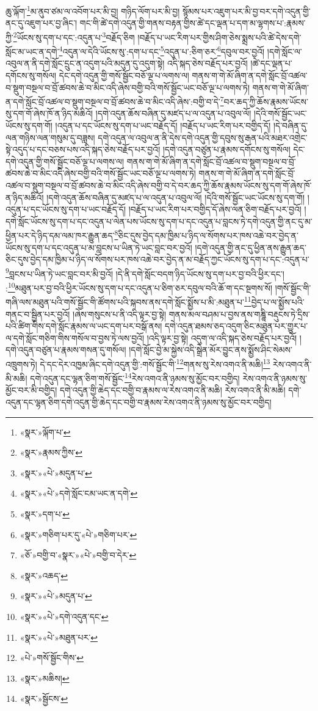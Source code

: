 ཆུ་ལྐོག་\footnote{«སྣར་»ལྐོག་པ་}མ་ནུབ་ཙམ་ལ་འབོག་པར་མི་བྱ། གཉིད་ལོག་པར་མི་བྱ། སྙོམས་པར་འཇུག་པར་མི་བྱ་བར་དགེ་འདུན་གྱི་ནང་དུ་འཇུག་པར་བྱ་ཞིང་། གང་གི་ཚེ་དགེ་འདུན་གྱི་གནས་བརྟན་གྱིས་ཚེ་དང་ལྡན་པ་དག་མ་ལྷགས་པ་:རྣམས་ཀྱི་\footnote{«སྣར་»རྣམས་ཀྱིས་}ཡོངས་སུ་དག་པ་དང་:འདུན་པ་\footnote{«སྣར་»«པེ་»མདུན་པ་}བརྗོད་ཅིག །བརྗོད་པ་ཡང་རིག་པར་གྱིས་ཤིག་ཅེས་སྨྲས་པའི་ཚེ་དེས་དགེ་སློང་མ་ཡང་ན་དགེ་\footnote{«སྣར་»«པེ་»དགེ་སློང་ངམ་ཡང་ན་དགེ་}འདུན་ལ་དེའི་ཡོངས་སུ་:དག་པ་དང་\footnote{«སྣར་»དག་པ་}འདུན་པ་:ཅིག་ཅར་\footnote{«སྣར་»གཅིག་པར་དུ་«པེ་»གཅིག་པར་}དབུལ་བར་བྱའོ། །དགེ་སློང་ལ་འབུལ་ན་ནི་དགེ་སློང་དྲུང་ན་འདུག་པའི་མདུན་དུ་འདུག་སྟེ། འདི་སྐད་ཅེས་བརྗོད་པར་བྱའོ། །ཚེ་དང་ལྡན་པ་དགོངས་སུ་གསོལ། དེང་དགེ་འདུན་གྱི་གསོ་སྦྱོང་བཅོ་ལྔ་པ་ལགས་ལ། གནས་ག་གེ་མོ་ཞིག་ན་དགེ་སློང་བྲོ་འཚལ་བ་སྡུག་བསྔལ་བ་བྲོ་ཚབས་ཆེ་བ་མིང་འདི་ཞེས་བགྱི་བའི་གསོ་སྦྱོང་ཡང་བཅོ་ལྔ་པ་ལགས་ཏེ། གནས་ག་གེ་མོ་ཞིག་ན་དགེ་སློང་བྲོ་འཚལ་བ་སྡུག་བསྔལ་བ་བྲོ་ཚབས་ཆེ་བ་མིང་འདི་ཞེས་:བགྱི་བ་དེ་\footnote{«ཅོ་»བགྱི་བ་«སྣར་»«པེ་»བགྱི་བ་དེར་}བར་ཆད་ཀྱི་ཆོས་རྣམས་ཡོངས་སུ་དག་གོ་ཞེས་ཁོ་ན་ཉིད་མཆིའོ། །དགེ་འདུན་ཆོས་བཞིན་དུ་མཛད་པ་ལ་འདུན་པ་འབུལ་ལོ། །དེའི་གསོ་སྦྱོང་ཡང་ཡོངས་སུ་དག་གོ། །འདུན་པ་དང་ཡོངས་སུ་དག་པ་ཡང་བརྗོད་དོ། །བརྗོད་པ་ཡང་རིག་པར་བགྱིད་དོ། །དེ་བཞིན་དུ་ལན་གཉིས་ལན་གསུམ་དུ་བཟླས། དགེ་འདུན་ལ་འབུལ་ན་ནི་དེས་དགེ་འདུན་གྱི་དབུས་སུ་རྒན་པའི་མཐར་འགྲེང་སྟེ་འདུད་པ་དང་བཅས་པས་འདི་སྐད་ཅེས་བརྗོད་པར་བྱའོ། །དགེ་འདུན་བཙུན་པ་རྣམས་དགོངས་སུ་གསོལ། དེང་དགེ་འདུན་གྱི་གསོ་སྦྱོང་བཅོ་ལྔ་པ་ལགས་ལ། གནས་ག་གེ་མོ་ཞིག་ན་དགེ་སློང་བྲོ་འཚལ་བ་སྡུག་བསྔལ་བ་བྲོ་ཚབས་ཆེ་བ་མིང་འདི་ཞེས་བགྱི་བའི་གསོ་སྦྱོང་ཡང་བཅོ་ལྔ་པ་ལགས་ཏེ། གནས་ག་གེ་མོ་ཞིག་ན་དགེ་སློང་བྲོ་འཚལ་བ་སྡུག་བསྔལ་བ་བྲོ་ཚབས་ཆེ་བ་མིང་འདི་ཞེས་བགྱི་བ་དེ་བར་ཆད་ཀྱི་ཆོས་རྣམས་ཡོངས་སུ་དག་གོ་ཞེས་ཁོ་ན་ཉིད་མཆིའོ། །དགེ་འདུན་ཆོས་བཞིན་དུ་མཛད་པ་ལ་འདུན་པ་འབུལ་ལོ། །དེའི་གསོ་སྦྱོང་ཡང་ཡོངས་སུ་དག་གོ། །འདུན་པ་དང་ཡོངས་སུ་དག་པ་ཡང་བརྗོད་དོ། །བརྗོད་པ་ཡང་རིག་པར་བགྱིད་དོ་ཞེས་ལན་ཅིག་བརྗོད་པར་བྱའོ། །དགེ་སློང་ཡོངས་སུ་དག་པ་དང་འདུན་པ་ལེན་པས་ཡོངས་སུ་དག་པ་དང་འདུན་པ་བླངས་ཏེ་དགེ་འདུན་གྱི་ནང་དུ་མ་ཕྱིན་པར་དེ་ཉིད་དམ་ལམ་ཁར་རྒྱུན་ཆད་\footnote{«སྣར་»འཆད་}ཅིང་དུས་བྱེད་དམ་ཁྱིམ་པ་ཉིད་ལ་སོགས་པར་ཁས་འཆེ་བར་བྱེད་ན་ཡོངས་སུ་དག་པ་དང་འདུན་པ་མ་བླངས་པ་ཡིན་ཏེ་ཡང་བླང་བར་བྱའོ། །དགེ་འདུན་གྱི་ནང་དུ་ཕྱིན་ནས་རྒྱུན་ཆད་ཅིང་དུས་བྱེད་དམ་ཁྱིམ་པ་ཉིད་ལ་སོགས་པར་ཁས་འཆེ་བར་བྱེད་ན་མ་བརྗོད་ཀྱང་ཡོངས་སུ་དག་པ་དང་:འདུན་པ་\footnote{«སྣར་»«པེ་»མདུན་པ་}བླངས་པ་ཡིན་ཏེ་ཡང་བླང་བར་མི་བྱའོ། །དེ་ནི་དགེ་སློང་བདག་ཉིད་ཡོངས་སུ་དག་པར་བྱ་བའི་ཕྱིར་དང་། :\footnote{«སྣར་»«པེ་»དགེ་འདུན་དང་}མཐུན་པར་བྱ་བའི་ཕྱིར་ཡོངས་སུ་དག་པ་དང་འདུན་པ་ཅིག་ཅར་དབུལ་བའི་ཆོ་ག་དང་སྔགས་སོ། །གསོ་སྦྱོང་གི་གཞི་ལས་མཐུན་པའི་གསོ་སྦྱོང་གི་ཚོགས་པའི་སྐབས་ནས་དགེ་སློང་སྨྱོས་པ་མི་:མཐུན་པ་\footnote{«སྣར་»«པེ་»མཐུན་པར་}བྱེད་པ་ལ་སྨྱོས་པའི་གནང་བ་སྦྱིན་པར་བྱའོ། །ཞེས་གསུངས་པ་ནི་འདི་ལྟར་བྱ་སྟེ། གནས་མལ་བཤམ་པ་བྱས་ནས་གཎྜཱི་བརྡུངས་ཏེ་དྲིས་པའི་ཚིག་གིས་དགེ་སློང་རྣམས་ལ་ཡང་དག་པར་བསྒོ་ནས། དགེ་འདུན་ཐམས་ཅད་འདུག་ཅིང་མཐུན་པར་གྱུར་པ་ལ་དགེ་སློང་གཅིག་གིས་གསོལ་བ་བྱས་ཏེ་ལས་བྱའོ། །འདི་ལྟར་བྱ་སྟེ། འདུག་ལ་འདི་སྐད་ཅེས་བརྗོད་པར་བྱའོ། །དགེ་འདུན་བཙུན་པ་རྣམས་གསན་དུ་གསོལ། །དགེ་སློང་བྱེ་མ་སྐྱེས་འདི་སྒྲེན་མོར་བྱུང་ནས་སྨྱོས་ཤིང་སེམས་འཁྲུགས་ཏེ། དེ་དང་དེར་འཁྱམ་ཞིང་དགེ་འདུན་གྱི་:གསོ་སྦྱོང་གི་\footnote{«པེ་»གསོ་སྦྱོང་གིས་}གནས་སུ་རེས་འགའ་ནི་མཆི།\footnote{«སྣར་»མཆིས།} རེས་འགའ་ནི་མི་མཆི། དགེ་འདུན་དང་ལྷན་ཅིག་གསོ་སྦྱོང་\footnote{«སྣར་»སྦྱོངས་}རེས་འགའ་ནི་ཉམས་སུ་མྱོང་བར་བགྱིད། རེས་འགའ་ནི་ཉམས་སུ་མྱོང་བར་མི་བགྱིད། དགེ་འདུན་གྱི་ཆེད་དང་བགྱི་བ་རྣམས་ལ་རེས་འགའ་ནི་མཆི། རེས་འགའ་ནི་མི་མཆི། དགེ་འདུན་དང་ལྷན་ཅིག་དགེ་འདུན་གྱི་ཆེད་དང་བགྱི་བ་རྣམས་རེས་འགའ་ནི་ཉམས་སུ་མྱོང་བར་བགྱིད། 